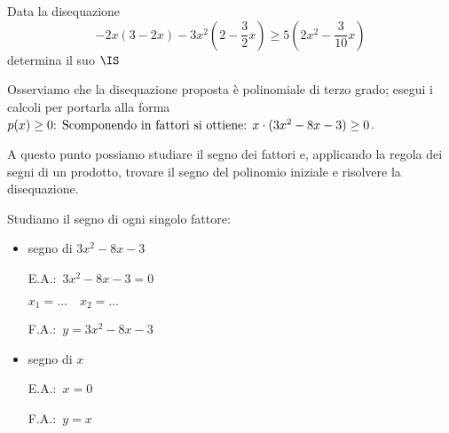 \begin{esempio}
Data la disequazione 
\[-2x(3-2x)-3x^2\left(2-\dfrac{3}{2}x\right) \ge 
  5\left(2x^2-\dfrac{3}{10}x\right)\] 
determina il suo \(\IS\)

Osserviamo che la disequazione proposta è polinomiale di terzo grado; 
esegui i calcoli per portarla alla forma \(p(x)\ge 0$: 
\vspace{3em}

Scomponendo in fattori si ottiene: \(x\cdot (3x^2-8x-3)\ge 0\). 

A questo punto possiamo studiare il segno dei fattori e, applicando la regola 
dei segni di un prodotto, trovare il segno del polinomio iniziale e risolvere 
la disequazione.

Studiamo il segno di ogni singolo fattore:
\begin{itemize}

 \item segno di \(3x^2-8x-3\)\\
 \begin{minipage}{.35\textwidth}
  E.A.:~\(3x^2-8x-3=0\)
  
  \(x_1=\dots \quad x_2=\dots\)
 \end{minipage}
 \begin{minipage}{.25\textwidth}
  F.A.:~\(y=3x^2-8x-3\)
 \end{minipage}
 \begin{minipage}{.38\textwidth}
  \begin{inaccessibleblock}
  \parabolaamadma{}{}
\end{inaccessibleblock}
 \end{minipage}
 
 \item  segno di \(x\)\\
 \begin{minipage}{.35\textwidth}
  E.A.:~\(x=0\)
  \vspace{1.8em}
 \end{minipage}
 \begin{minipage}{.25\textwidth}
  F.A.:~\(y=x\)
  \vspace{1.8em}
 \end{minipage}
 \begin{minipage}{.38\textwidth}
  \begin{inaccessibleblock}
\end{inaccessibleblock}
 \end{minipage}
 

\end{itemize}
\end{esempio}
